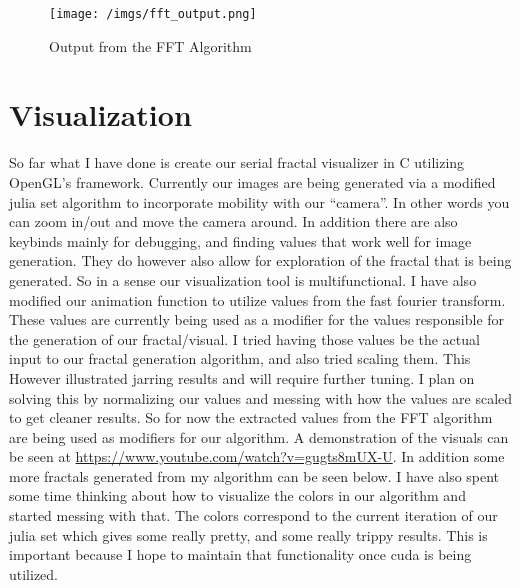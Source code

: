 \documentclass{article}
\begin{document}
\begin{figure}
    \centering
    \texttt{[image: /imgs/fft\_output.png]}
    \caption{Output from the FFT Algorithm}
\end{figure}

\section{Visualization}
\par So far what I have done is create our serial fractal visualizer in C utilizing OpenGL's framework. Currently our images are being generated via a modified julia set algorithm to incorporate mobility with our “camera”. In other words you can zoom in/out and move the camera around. In addition there are also keybinds mainly for debugging, and finding values that work well for image generation. They do however also allow for exploration of the fractal that is being generated. So in a sense our visualization tool is multifunctional. I have also modified our animation function to utilize values from the fast fourier transform. These values are currently being used as a modifier for the values responsible for the generation of our fractal/visual. I tried having those values be the actual input to our fractal generation algorithm, and also tried scaling them. This However illustrated jarring results and will require further tuning. I plan on solving this by normalizing our values and messing with how the values are scaled to get cleaner results. So for now the extracted values from the FFT algorithm are being used as modifiers for our algorithm. A demonstration of the visuals can be seen at \url{https://www.youtube.com/watch?v=gugts8mUX-U}. In addition some more fractals generated from my algorithm can be seen below.  I have also spent some time thinking about how to visualize the colors in our algorithm and started messing with that. The colors correspond to the current iteration of our julia set which gives some really pretty, and some really trippy results. This is important because I hope to maintain that functionality once cuda is being utilized.
\end{document}
